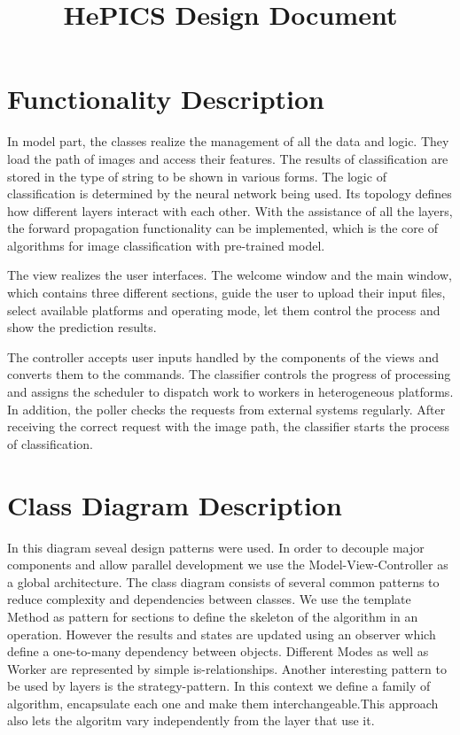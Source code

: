 \documentclass[parskip=full]{scrartcl}
\title{HePICS Design Document}
\begin{document}
\maketitle
\thispagestyle{empty}
\pagebreak





\tableofcontents
\pagebreak





\section {Functionality Description}

In model part, the classes realize the management of all the data and logic. They load the path of images and access their features. The results of classification are stored in the type of string to be shown in various forms. The logic of classification is determined by the neural network being used. Its topology defines how different layers interact with each other. With the assistance of all the layers, the forward propagation functionality can be implemented, which is the core of algorithms for image classification with pre-trained model.

The view realizes the user interfaces. The welcome window and the main window, which contains three different sections, guide the user to upload their input files, select available platforms and operating mode, let them control the process and show the prediction results. 

The controller accepts user inputs handled by the components of the views and converts them to the commands. The classifier controls the progress of processing and assigns the scheduler to dispatch work to workers in heterogeneous platforms. In addition, the poller checks the requests from external systems regularly. After receiving the correct request with the image path, the classifier starts the process of classification.

\section {Class Diagram Description}

In this diagram seveal design patterns were used.
In order to decouple  major components and allow parallel development we use the Model-View-Controller as a global architecture.
The class diagram consists of several common patterns to reduce complexity and dependencies between classes.
We use the template Method as pattern for sections to define the skeleton of the algorithm in an operation.
However the results and states are updated using an observer which define a one-to-many dependency between objects.
Different Modes as well as Worker are represented by simple is-relationships.
Another interesting pattern to be used by layers is the strategy-pattern. In this context we define a family of algorithm, encapsulate
each one and make them interchangeable.This approach also lets the algoritm vary independently from the layer that use it.
\end{document}
